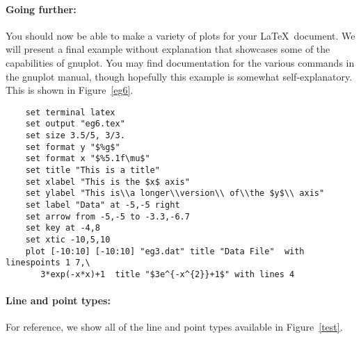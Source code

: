 \paragraph{Going further:} You should now be able to make a variety of
plots for your \LaTeX\ document. We will present a final example
without explanation that showcases some of the capabilities of
gnuplot. You may find documentation for the various commands in the
gnuplot manual, though hopefully this example is somewhat
self-explanatory. This is shown in Figure~\ref{eg6}.

\singlespace
\begin{verbatim}
    set terminal latex
    set output "eg6.tex"
    set size 3.5/5, 3/3.
    set format y "$%g$"
    set format x "$%5.1f\mu$"
    set title "This is a title"
    set xlabel "This is the $x$ axis"
    set ylabel "This is\\a longer\\version\\ of\\the $y$\\ axis"
    set label "Data" at -5,-5 right
    set arrow from -5,-5 to -3.3,-6.7
    set key at -4,8
    set xtic -10,5,10
    plot [-10:10] [-10:10] "eg3.dat" title "Data File"  with linespoints 1 7,\
       3*exp(-x*x)+1  title "$3e^{-x^{2}}+1$" with lines 4
\end{verbatim}
\currentspace


\paragraph{Line and point types:} For reference, we show all of the
line and point types available in Figure~\ref{test}.


